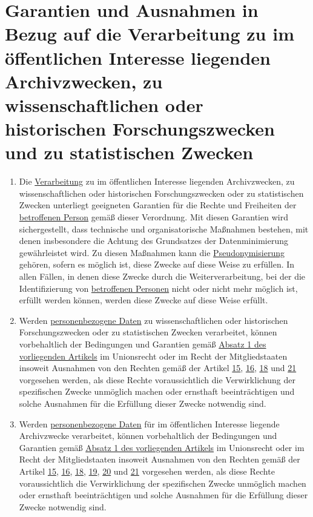 \chapter{Garantien und Ausnahmen in Bezug auf die Verarbeitung zu im öffentlichen Interesse liegenden Archivzwecken, zu
 wissenschaftlichen oder historischen Forschungszwecken und zu statistischen Zwecken}
\label{ch:89}


\begin{enumerate}

  \item Die \hyperref[itm:04-2]{Verarbeitung} zu im öffentlichen Interesse liegenden Archivzwecken, zu
   wissenschaftlichen oder historischen Forschungszwecken oder zu statistischen Zwecken unterliegt geeigneten Garantien
   für die Rechte und Freiheiten der
   \hyperref[itm:04-1]{betroffenen Person} gemäß dieser Verordnung. Mit diesen Garantien wird sichergestellt, dass
    technische und organisatorische Maßnahmen bestehen, mit denen insbesondere die Achtung des Grundsatzes der
    Datenminimierung gewährleistet wird. Zu diesen Maßnahmen kann die \hyperref[itm:04-5]{Pseudonymisierung} gehören,
    sofern es möglich ist, diese Zwecke auf diese Weise zu erfüllen. In allen Fällen, in denen diese Zwecke durch die
    Weiterverarbeitung, bei der die Identifizierung von \hyperref[itm:04-1]{betroffenen Personen} nicht oder nicht mehr
    möglich ist, erfüllt werden können, werden diese Zwecke auf diese Weise erfüllt.
  \label{itm:89-1}

  \item Werden \hyperref[itm:04-1]{personenbezogene Daten} zu wissenschaftlichen oder historischen Forschungszwecken
   oder zu statistischen Zwecken verarbeitet, können vorbehaltlich der Bedingungen und Garantien gemäß \hyperref
   [itm:89-1]{Absatz 1 des vorliegenden Artikels} im Unionsrecht oder im Recht der Mitgliedstaaten insoweit Ausnahmen
   von den Rechten gemäß der Artikel \hyperref[ch:15]{15}, \hyperref[ch:16]{16}, \hyperref[ch:18]{18} und \hyperref
   [ch:21]{21} vorgesehen werden, als diese Rechte voraussichtlich die Verwirklichung der spezifischen Zwecke unmöglich
   machen oder ernsthaft beeinträchtigen und solche Ausnahmen für die Erfüllung dieser Zwecke notwendig sind.
  \label{itm:89-2}

  \item Werden \hyperref[itm:04-1]{personenbezogene Daten} für im öffentlichen Interesse liegende Archivzwecke
   verarbeitet, können vorbehaltlich der Bedingungen und Garantien gemäß \hyperref[itm:89-1]{Absatz 1 des vorliegenden
   Artikels} im Unionsrecht oder im Recht der Mitgliedstaaten insoweit Ausnahmen von den Rechten gemäß der
   Artikel \hyperref[ch:15]{15}, \hyperref[ch:16]{16}, \hyperref[ch:18]{18}, \hyperref[ch:19]{19}, \hyperref[ch:20]
   {20} und \hyperref[ch:21]{21} vorgesehen werden, als diese Rechte voraussichtlich die Verwirklichung der
   spezifischen Zwecke unmöglich machen oder ernsthaft beeinträchtigen und solche Ausnahmen für die Erfüllung dieser
   Zwecke notwendig sind.
  \label{itm:89-3}


\end{enumerate}
